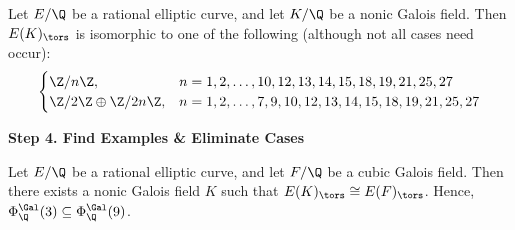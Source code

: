 \begin{frame}[plain,c]
\footnotesize
\begin{lem}[M.]
Let $E/\Q$ be a rational elliptic curve, and let $K/\Q$ be a nonic Galois field. Then $E(K)_\tors$ is isomorphic to one of the following (although not all cases need occur):
	\[
	\begin{cases}
	\Z/n\Z, & n= 1, 2, \ldots, 10, 12, 13, 14, 15, 18, 19, 21, 25, 27 \\
	\Z/2\Z \oplus \Z/2n\Z, & n= 1, 2, \ldots, 7, 9, 10, 12, 13, 14, 15, 18, 19, 21, 25, 27
	\end{cases}
	\]
\end{lem}
\end{frame}





\begin{frame}[plain]
\vfill
\begin{center} {\bfseries \Large \textcolor{UniOrange}{Step 4. Find Examples \& Eliminate Cases}} \end{center}
\vfill 
\end{frame}





\begin{frame}[plain,c]


\begin{lem}[M.]
Let $E/\Q$ be a rational elliptic curve, and let $F/\Q$ be a cubic Galois field. Then there exists a nonic Galois field $K$ such that $E(K)_\tors \cong E(F)_\tors$. Hence, $\Phi_\Q^{\Gal}(3) \subseteq \Phi_\Q^{\Gal}(9)$.
\end{lem}
\end{frame}





